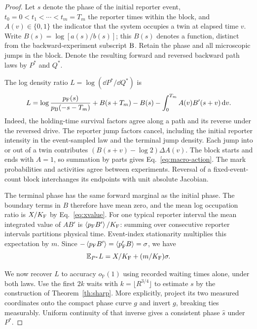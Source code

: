 \begin{proof}
Let $s$ denote the phase of the initial reporter event, $t_0=0<t_1<\cdots<t_m=T_m$ the reporter times within the block, and $A(v)\in\{0,1\}$ the indicator that the system occupies a twin at elapsed time $v$. Write $B(s)=\log[a(s)/b(s)]$; this $B(s)$ denotes a function, distinct from the backward-experiment subscript $\mathrm B$. Retain the phase and all microscopic jumps in the block. Denote the resulting forward and reversed backward path laws by $P^*$ and $Q^*$.

The log density ratio $L=\log(\dd P^*/\dd Q^*)$ is
\begin{equation}
 L=\log\frac{p_\mathrm F(s)}{p_\mathrm B(-s-T_m)}
       +B(s+T_m)-B(s)-\int_0^{T_m} A(v)B'(s+v)\,\mathrm d v .
 \label{eq:macro-action}
\end{equation}
Indeed, the holding-time survival factors agree along a path and its reverse under the reversed drive. The reporter jump factors cancel, including the initial reporter intensity in the event-sampled law and the terminal jump density. Each jump into or out of a twin contributes $(B(s+v)-\log 2)\Delta A(v)$. The block starts and ends with $A=1$, so summation by parts gives Eq.~\eqref{eq:macro-action}. The mark probabilities and activities agree between experiments. Reversal of a fixed-event-count block interchanges its endpoints with unit absolute Jacobian.

The terminal phase has the same forward marginal as the initial phase. The boundary terms in $B$ therefore have mean zero, and the mean log occupation ratio is $X/K_\mathrm F$ by Eq.~\eqref{eq:xvalue}. For one typical reporter interval the mean integrated value of $A B'$ is $\left\langle p_\mathrm F B'\right\rangle/K_\mathrm F$: summing over consecutive reporter intervals partitions physical time. Event-index stationarity multiplies this expectation by $m$. Since $-\left\langle p_\mathrm F B'\right\rangle=\left\langle p'_\mathrm F B\right\rangle=\sigma$, we have
\begin{equation}
 {\mathbb E}_{P^*}L=X/K_\mathrm F+(m/K_\mathrm F)\sigma .
 \label{eq:macro-joint}
\end{equation}

We now recover $L$ to accuracy $o_{\mathbb P}(1)$ using recorded waiting times alone, under both laws. Use the first $2k$ waits with $k=\lfloor R^{3/4}\rfloor$ to estimate $s$ by the construction of Theorem~\ref{th:sharp}. More explicitly, project its two measured coordinates onto the compact phase curve $g$ and invert $g$, breaking ties measurably. Uniform continuity of that inverse gives a consistent phase $\widehat s$ under $P^*$.


\end{proof}
